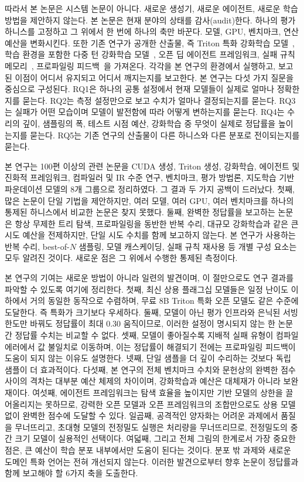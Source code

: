 \documentclass[11pt]{article}
\begin{document}
따라서 본 논문은 시스템 논문이 아니다. 새로운 생성기, 새로운 에이전트, 새로운 학습 방법을
제안하지 않는다. 본 논문은 현재 분야의 상태를 감사(audit)한다. 하나의 평가 하니스를 고정하고
그 위에서 한 번에 하나의 축만 바꾼다. 모델, GPU, 벤치마크, 연산 예산을 변화시킨다. 또한 기존
연구가 공개한 산출물, 즉 Triton 특화 강화학습 모델~\citep{li2025autotriton}, 학습 환경을 포함한
다중 턴 강화학습 모델~\citep{drkernel2026}, 오픈 딥 에이전트 프레임워크, 실패 규칙
메모리~\citep{du2026adaexplore}, 프로파일링 피드백~\citep{cudaforge2025}을 가져온다. 각각을 본 연구의
환경에서 실행하고, 보고된 이점이 어디서 유지되고 어디서 깨지는지를 보고한다. 본 연구는 다섯 가지
질문을 중심으로 구성된다.
RQ1은 하나의 공통 설정에서 현재 모델들이 실제로 얼마나 정확한지를 묻는다. RQ2는 측정 설정만으로
보고 수치가 얼마나 결정되는지를 묻는다. RQ3는 실패가 어떤 모습이며 모델이 발전함에 따라 어떻게
변하는지를 묻는다. RQ4는 수리의 깊이, 샘플링의 폭, 테스트 시점 예산, 강화학습 중 무엇이 실제로
정답률을 높이는지를 묻는다. RQ5는 기존 연구의 산출물이 다른 하니스와 다른 분포로 전이되는지를
묻는다.

본 연구는 100편 이상의 관련 논문을 CUDA 생성, Triton 생성, 강화학습, 에이전트 및 진화적
프레임워크, 컴파일러 및 IR 수준 연구, 벤치마크, 평가 방법론, 지도학습 기반 파운데이션 모델의
8개 그룹으로 정리하였다. 그 결과 두 가지 공백이 드러났다. 첫째, 많은 논문이 단일 기법을 제안하지만,
여러 모델, 여러 GPU, 여러 벤치마크를 하나의 통제된 하니스에서 비교한 논문은 찾지 못했다.
둘째, 완벽한 정답률을 보고하는 논문은 항상 무제한 트리 탐색, 프로파일링을 동반한 반복 수리,
대규모 강화학습과 같은 큰 시도 예산을 전제하지만, 단일 시도 수치를 함께 보고하지 않는다.
본 연구가 사용하는 반복 수리, best-of-$N$ 샘플링, 모델 캐스케이딩, 실패 규칙 재사용 등 개별
구성 요소는 모두 알려진 것이다. 새로운 점은 그 위에서 수행한 통제된 측정이다.

본 연구의 기여는 새로운 방법이 아니라 일련의 발견이며, 이 절만으로도 연구 결과를 파악할 수 있도록
여기에 정리한다. 첫째, 최신 상용 플래그십 모델들은 일정 난이도 이하에서 거의 동일한 동작으로
수렴하며, 무료 8B Triton 특화 오픈 모델도 같은 수준에 도달한다. 즉 특화가 크기보다 우세하다.
둘째, 모델이 아닌 평가 인프라와 은닉된 서빙 한도만 바꿔도 정답률이 최대 0.30 움직이므로, 이러한
설정이 명시되지 않는 한 논문 간 정답률 수치는 비교할 수 없다. 셋째, 모델이 좋아질수록 지배적
실패 유형이 컴파일 에러에서 값 불일치로 이동하며, 이는 정답률이 해결되기 전에는 프로파일링
피드백이 도움이 되지 않는 이유도 설명한다. 넷째, 단일 샘플을 더 깊이 수리하는 것보다 독립 샘플이
더 효과적이다. 다섯째, 본 연구의 전체 벤치마크 수치와 문헌상의 완벽한 점수 사이의 격차는 대부분
예산 체제의 차이이며, 강화학습과 예산은 대체재가 아니라 보완재이다. 여섯째, 에이전트 프레임워크는
탐색 효율을 높이지만 기반 모델의 상한을 끌어올리지는 못하므로, 강력한 오픈 모델과 오픈 프레임워크의
조합만으로도 상용 모델 없이 완벽한 점수에 도달할 수 있다. 일곱째, 공격적인 양자화는 어려운
과제에서 품질을 무너뜨리고, 초대형 모델의 전정밀도 실행은 처리량을 무너뜨리므로, 전정밀도의
중간 크기 모델이 실용적인 선택이다. 여덟째, 그리고 전체 그림의 한계로서 가장 중요한 점은, 큰
예산이 학습 분포 내부에서만 도움이 된다는 것이다. 분포 밖 과제와 새로운 도메인 특화 언어는 전혀
개선되지 않는다. 이러한 발견으로부터 향후 논문이 정답률과 함께 보고해야 할 6가지 축을 도출한다.
\end{document}
